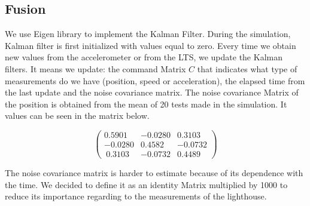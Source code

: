 \documentclass{vldb}
\begin{document}
\subsection{Fusion} \label{Fusion} 

We use Eigen library to implement the Kalman Filter. During the simulation, Kalman filter is first initialized with values equal to zero. Every time we obtain new values from the accelerometer or from the LTS, we update the Kalman filters. It means we update: the command Matrix $C$ that indicates what type of measurements do we have (position, speed or acceleration), the elapsed time from the last update and the noise covariance matrix. \newline
The noise covariance Matrix of the position is obtained from the mean of 20 tests made in the simulation. It values can be seen in the matrix below.

$$\begin{pmatrix}
0.5901 & -0.0280 & 0.3103 \\
-0.0280 & 0.4582 & -0.0732 \\\
0.3103 & -0.0732 & 0.4489
\end{pmatrix}$$

The noise covariance matrix is harder to estimate because of its dependence with the time. We decided to define it as an identity Matrix multiplied by 1000 to reduce its importance regarding to the measurements of the lighthouse.
\end{document}

